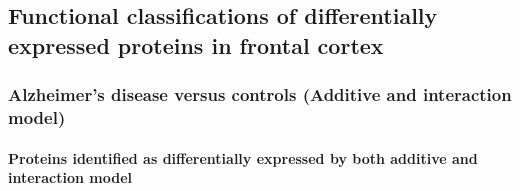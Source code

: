\subsection{Functional classifications of differentially expressed proteins in frontal cortex}
\label{subsec:funct-class-diff}

\subsubsection{Alzheimer's disease versus controls (Additive and interaction model)}
\label{sec:prot-ident-alzh}

\paragraph{Proteins identified as differentially expressed by both additive and interaction model}

